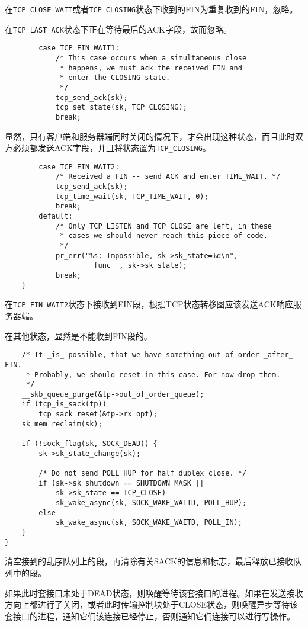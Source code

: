 			在\texttt{TCP_CLOSE_WAIT}或者\texttt{TCP_CLOSING}状态下收到的FIN为重复收到的FIN，忽略。

			在\texttt{TCP_LAST_ACK}状态下正在等待最后的ACK字段，故而忽略。

\begin{verbatim}
		case TCP_FIN_WAIT1:
			/* This case occurs when a simultaneous close
			 * happens, we must ack the received FIN and
			 * enter the CLOSING state.
			 */
			tcp_send_ack(sk);
			tcp_set_state(sk, TCP_CLOSING);
			break;
\end{verbatim}

			显然，只有客户端和服务器端同时关闭的情况下，才会出现这种状态，而且此时双方必须都发送ACK字段，并且将状态置为\texttt{TCP_CLOSING}。

\begin{verbatim}
		case TCP_FIN_WAIT2:
			/* Received a FIN -- send ACK and enter TIME_WAIT. */
			tcp_send_ack(sk);
			tcp_time_wait(sk, TCP_TIME_WAIT, 0);
			break;
		default:
			/* Only TCP_LISTEN and TCP_CLOSE are left, in these
			 * cases we should never reach this piece of code.
			 */
			pr_err("%s: Impossible, sk->sk_state=%d\n",
				   __func__, sk->sk_state);
			break;
	}
\end{verbatim}

			在\texttt{TCP_FIN_WAIT2}状态下接收到FIN段，根据TCP状态转移图应该发送ACK响应服务器端。

			在其他状态，显然是不能收到FIN段的。

\begin{verbatim}
	/* It _is_ possible, that we have something out-of-order _after_ FIN.
	 * Probably, we should reset in this case. For now drop them.
	 */
	__skb_queue_purge(&tp->out_of_order_queue);
	if (tcp_is_sack(tp))
		tcp_sack_reset(&tp->rx_opt);
	sk_mem_reclaim(sk);

	if (!sock_flag(sk, SOCK_DEAD)) {
		sk->sk_state_change(sk);

		/* Do not send POLL_HUP for half duplex close. */
		if (sk->sk_shutdown == SHUTDOWN_MASK ||
		    sk->sk_state == TCP_CLOSE)
			sk_wake_async(sk, SOCK_WAKE_WAITD, POLL_HUP);
		else
			sk_wake_async(sk, SOCK_WAKE_WAITD, POLL_IN);
	}
}
\end{verbatim}

			清空接到的乱序队列上的段，再清除有关SACK的信息和标志，最后释放已接收队列中的段。

			如果此时套接口未处于DEAD状态，则唤醒等待该套接口的进程。如果在发送接收方向上都进行了关闭，或者此时传输控制块处于CLOSE状态，则唤醒异步等待该套接口的进程，通知它们该连接已经停止，否则通知它们连接可以进行写操作。
